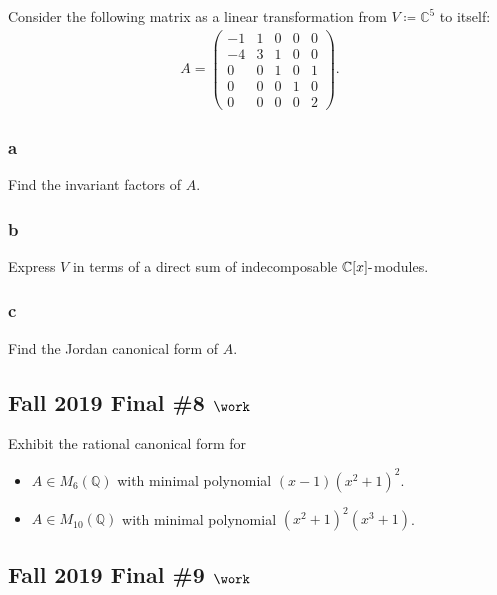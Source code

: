 Consider the following matrix as a linear transformation from
\(V\coloneqq{\mathbb{C}}^5\) to itself:
\begin{align*}
A=\left(\begin{array}{ccccc}
-1 & 1 & 0 & 0 & 0 \\
-4 & 3 & 1 & 0 & 0 \\
0 & 0 & 1 & 0 & 1 \\
0 & 0 & 0 & 1 & 0 \\
0 & 0 & 0 & 0 & 2
\end{array}\right)
.\end{align*}

\hypertarget{a-108}{%
\subsubsection{a}\label{a-108}}

Find the invariant factors of \(A\).

\hypertarget{b-98}{%
\subsubsection{b}\label{b-98}}

Express \(V\) in terms of a direct sum of indecomposable
\({\mathbb{C}}[x]{\hbox{-}}\)modules.

\hypertarget{c-59}{%
\subsubsection{c}\label{c-59}}

Find the Jordan canonical form of \(A\).

\hypertarget{fall-2019-final-8-work}{%
\subsection{\texorpdfstring{Fall 2019 Final \#8
\(\work\)}{Fall 2019 Final \#8 \textbackslash work}}\label{fall-2019-final-8-work}}

Exhibit the rational canonical form for

\begin{itemize}
\tightlist
\item
  \(A\in M_6({\mathbb{Q}})\) with minimal polynomial
  \((x-1)(x^2 + 1)^2\).
\item
  \(A\in M_{10}({\mathbb{Q}})\) with minimal polynomial
  \((x^2+1)^2(x^3 + 1)\).
\end{itemize}

\hypertarget{fall-2019-final-9-work}{%
\subsection{\texorpdfstring{Fall 2019 Final \#9
\(\work\)}{Fall 2019 Final \#9 \textbackslash work}}\label{fall-2019-final-9-work}}


